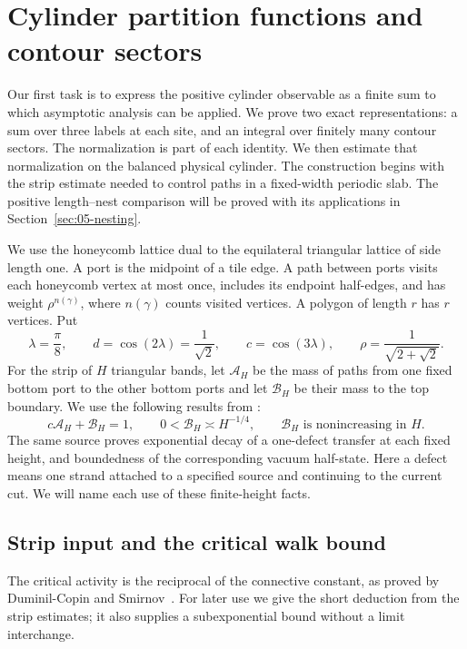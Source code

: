 \section{Cylinder partition functions and contour sectors}
\label{sec:02-cylinder}

Our first task is to express the positive cylinder observable as a
finite sum to which asymptotic analysis can be applied. We prove two
exact representations: a sum over three labels at each site, and an
integral over finitely many contour sectors. The normalization is part
of each identity. We then estimate that normalization on the balanced
physical cylinder. The construction begins with the strip estimate needed to control
paths in a fixed-width periodic slab. The positive length--nest
comparison will be proved with its applications in
Section~\ref{sec:05-nesting}.

We use the honeycomb lattice dual to the equilateral triangular lattice
of side length one. A port is the midpoint of a tile edge. A path between
ports visits each honeycomb vertex at most once, includes its endpoint
half-edges, and has weight $\rho^{n(\gamma)}$, where $n(\gamma)$ counts
visited vertices. A polygon of length $r$ has $r$ vertices. Put
\[
 \lambda=\frac\pi8,\qquad
 d=\cos(2\lambda)=\frac1{\sqrt2},\qquad c=\cos(3\lambda),\qquad
 \rho=\frac1{\sqrt{2+\sqrt2}}.
\]
For the strip of $H$ triangular bands, let $\mathcal A_H$ be the mass
of paths from one fixed bottom port to the other bottom ports and let
$\mathcal B_H$ be their mass to the top boundary. We use the following
results from \cite[Theorem 1.1 and Lemmas 2.1, 2.3]{StripCompanion}:
\begin{equation}\label{eq:E-strip-input}
 c\mathcal A_H+\mathcal B_H=1,\qquad
 0<\mathcal B_H\asymp H^{-1/4},\qquad
 \mathcal B_H\text{ is nonincreasing in }H.
\end{equation}
The same source proves exponential decay of a one-defect transfer at
each fixed height, and boundedness of the corresponding vacuum
half-state. Here a defect means one strand attached to a specified
source and continuing to the current cut. We will name each use of
these finite-height facts.

\subsection{Strip input and the critical walk bound}

The critical activity is the reciprocal of the connective constant,
as proved by Duminil-Copin and Smirnov~\cite{DCS2012}. For later use
we give the short deduction from the strip estimates; it also supplies
a subexponential bound without a limit interchange.

